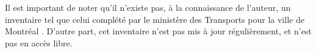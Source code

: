   Il est important de noter qu'il n'existe pas, à la connaissance de l'auteur, un inventaire tel que celui complété par le ministère des Transports pour la ville de Montréal \parencite{consortium_cima_-_daniel_arbour_et_associes_inventaire_1998}. D'autre part, cet inventaire n'est pas mis à jour régulièrement, et n'est pas en accès libre.